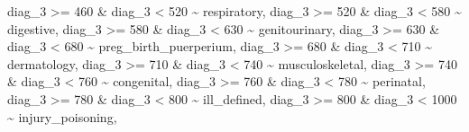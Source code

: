 \documentclass[
]{article}
\newenvironment{Shaded}{\begin{snugshade}}{\end{snugshade}}
\newcommand{\DecValTok}[1]{\textcolor[rgb]{0.00,0.00,0.81}{#1}}
\newcommand{\NormalTok}[1]{#1}
\newcommand{\SpecialCharTok}[1]{\textcolor[rgb]{0.00,0.00,0.00}{#1}}
\newcommand{\StringTok}[1]{\textcolor[rgb]{0.31,0.60,0.02}{#1}}
\begin{document}
\begin{Shaded}
\begin{Highlighting}[]
\NormalTok{      diag\_3 }\SpecialCharTok{\textgreater{}=} \DecValTok{460} \SpecialCharTok{\&}\NormalTok{ diag\_3 }\SpecialCharTok{\textless{}} \DecValTok{520} \SpecialCharTok{\textasciitilde{}} \StringTok{\textquotesingle{}respiratory\textquotesingle{}}\NormalTok{,}
\NormalTok{      diag\_3 }\SpecialCharTok{\textgreater{}=} \DecValTok{520} \SpecialCharTok{\&}\NormalTok{ diag\_3 }\SpecialCharTok{\textless{}} \DecValTok{580} \SpecialCharTok{\textasciitilde{}} \StringTok{\textquotesingle{}digestive\textquotesingle{}}\NormalTok{,}
\NormalTok{      diag\_3 }\SpecialCharTok{\textgreater{}=} \DecValTok{580} \SpecialCharTok{\&}\NormalTok{ diag\_3 }\SpecialCharTok{\textless{}} \DecValTok{630} \SpecialCharTok{\textasciitilde{}} \StringTok{\textquotesingle{}genitourinary\textquotesingle{}}\NormalTok{,}
\NormalTok{      diag\_3 }\SpecialCharTok{\textgreater{}=} \DecValTok{630} \SpecialCharTok{\&}\NormalTok{ diag\_3 }\SpecialCharTok{\textless{}} \DecValTok{680} \SpecialCharTok{\textasciitilde{}} \StringTok{\textquotesingle{}preg\_birth\_puerperium\textquotesingle{}}\NormalTok{,}
\NormalTok{      diag\_3 }\SpecialCharTok{\textgreater{}=} \DecValTok{680} \SpecialCharTok{\&}\NormalTok{ diag\_3 }\SpecialCharTok{\textless{}} \DecValTok{710} \SpecialCharTok{\textasciitilde{}} \StringTok{\textquotesingle{}dermatology\textquotesingle{}}\NormalTok{,}
\NormalTok{      diag\_3 }\SpecialCharTok{\textgreater{}=} \DecValTok{710} \SpecialCharTok{\&}\NormalTok{ diag\_3 }\SpecialCharTok{\textless{}} \DecValTok{740} \SpecialCharTok{\textasciitilde{}} \StringTok{\textquotesingle{}musculoskeletal\textquotesingle{}}\NormalTok{,}
\NormalTok{      diag\_3 }\SpecialCharTok{\textgreater{}=} \DecValTok{740} \SpecialCharTok{\&}\NormalTok{ diag\_3 }\SpecialCharTok{\textless{}} \DecValTok{760} \SpecialCharTok{\textasciitilde{}} \StringTok{\textquotesingle{}congenital\textquotesingle{}}\NormalTok{,}
\NormalTok{      diag\_3 }\SpecialCharTok{\textgreater{}=} \DecValTok{760} \SpecialCharTok{\&}\NormalTok{ diag\_3 }\SpecialCharTok{\textless{}} \DecValTok{780} \SpecialCharTok{\textasciitilde{}} \StringTok{\textquotesingle{}perinatal\textquotesingle{}}\NormalTok{,}
\NormalTok{      diag\_3 }\SpecialCharTok{\textgreater{}=} \DecValTok{780} \SpecialCharTok{\&}\NormalTok{ diag\_3 }\SpecialCharTok{\textless{}} \DecValTok{800} \SpecialCharTok{\textasciitilde{}} \StringTok{\textquotesingle{}ill\_defined\textquotesingle{}}\NormalTok{,}
\NormalTok{      diag\_3 }\SpecialCharTok{\textgreater{}=} \DecValTok{800} \SpecialCharTok{\&}\NormalTok{ diag\_3 }\SpecialCharTok{\textless{}} \DecValTok{1000} \SpecialCharTok{\textasciitilde{}} \StringTok{\textquotesingle{}injury\_poisoning\textquotesingle{}}\NormalTok{,}

\end{Highlighting}
\end{Shaded}
\end{document}
